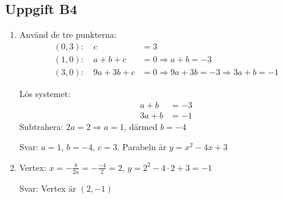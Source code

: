 \documentclass[12pt]{article}
\begin{document}
\subsection*{Uppgift B4}
\begin{enumerate}[label=\alph*)]
    \item Använd de tre punkterna:
    \begin{align*}
    (0, 3): \quad c &= 3 \\
    (1, 0): \quad a + b + c &= 0 \Rightarrow a + b = -3 \\
    (3, 0): \quad 9a + 3b + c &= 0 \Rightarrow 9a + 3b = -3 \Rightarrow 3a + b = -1
    \end{align*}
    
    Lös systemet:
    \begin{align*}
    a + b &= -3 \\
    3a + b &= -1
    \end{align*}
    Subtrahera: $2a = 2 \Rightarrow a = 1$, därmed $b = -4$
    
    Svar: $a = 1$, $b = -4$, $c = 3$. Parabeln är $y = x^2 - 4x + 3$
    
    \item Vertex: $x = -\frac{b}{2a} = -\frac{-4}{2} = 2$, $y = 2^2 - 4 \cdot 2 + 3 = -1$
    
    Svar: Vertex är $(2, -1)$
\end{enumerate}
\end{document}
